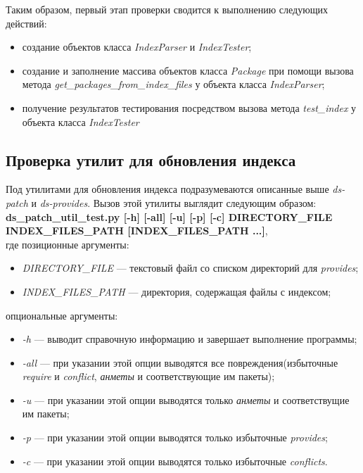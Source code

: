 Таким образом, первый этап проверки сводится к выполнению следующих действий:
\begin{itemize}
\item{создание объектов класса \textit{IndexParser} и \textit{IndexTester};}
\item{создание и заполнение массива объектов класса \textit{Package} при помощи
вызова метода \textit{get\_packages\_from\_index\_files} у объекта класса \textit{IndexParser};}
\item{получение результатов тестирования посредством вызова метода \textit{test\_index}
у объекта класса \textit{IndexTester}}
\end{itemize}



\subsection{Проверка утилит для обновления индекса}
Под утилитами для обновления индекса подразумеваются описанные
выше \textit{ds-patch} и \textit{ds-provides}.
Вызов этой утилиты выглядит следующим образом:\\
\textbf{ds\_patch\_util\_test.py [-h] [-all] [-u] [-p] [-c] DIRECTORY\_FILE INDEX\_FILES\_PATH [INDEX\_FILES\_PATH ...]},\\
 где
позиционные аргументы:\\
\begin{itemize}
\item{\emph{DIRECTORY\_FILE} --- текстовый файл со списком директорий для \textit{provides};}
\item{\emph{INDEX\_FILES\_PATH} --- директория, содержащая файлы с индексом;}
\end{itemize}
опциональные аргументы:\\
\begin{itemize}
\item{\emph{-h} --- выводит справочную информацию и завершает выполнение программы;}
\item{\emph{-all} --- при указании этой опции выводятся все повреждения(избыточные \textit{require} и \textit{conflict}, \textit{анметы} и
соответствующие им пакеты);}
\item{\emph{-u} --- при указании этой опции выводятся только \textit{анметы} и соответствущие им пакеты;}
\item{\emph{-p} --- при указании этой опции выводятся только  избыточные \textit{provides};}
\item{\emph{-c} --- при указании этой опции выводятся только избыточные \textit{conflicts}.}
\end{itemize}

